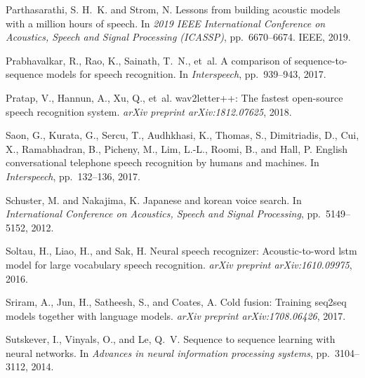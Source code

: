 \documentclass{article}
\begin{document}
\begin{thebibliography}{99}
Parthasarathi, S. H.~K. and Strom, N.
\newblock Lessons from building acoustic models with a million hours of speech.
\newblock In \emph{2019 IEEE International Conference on Acoustics, Speech and
  Signal Processing (ICASSP)}, pp.\  6670--6674. IEEE, 2019.

Prabhavalkar, R., Rao, K., Sainath, T.~N., et~al.
\newblock A comparison of sequence-to-sequence models for speech recognition.
\newblock In \emph{Interspeech}, pp.\  939--943, 2017.

Pratap, V., Hannun, A., Xu, Q., et~al.
\newblock wav2letter++: The fastest open-source speech recognition system.
\newblock \emph{arXiv preprint arXiv:1812.07625}, 2018.

Saon, G., Kurata, G., Sercu, T., Audhkhasi, K., Thomas, S., Dimitriadis, D.,
  Cui, X., Ramabhadran, B., Picheny, M., Lim, L.-L., Roomi, B., and Hall, P.
\newblock English conversational telephone speech recognition by humans and
  machines.
\newblock In \emph{Interspeech}, pp.\  132--136, 2017.

Schuster, M. and Nakajima, K.
\newblock Japanese and korean voice search.
\newblock In \emph{International Conference on Acoustics, Speech and Signal
  Processing}, pp.\  5149--5152, 2012.

Soltau, H., Liao, H., and Sak, H.
\newblock Neural speech recognizer: Acoustic-to-word lstm model for large
  vocabulary speech recognition.
\newblock \emph{arXiv preprint arXiv:1610.09975}, 2016.

Sriram, A., Jun, H., Satheesh, S., and Coates, A.
\newblock Cold fusion: Training seq2seq models together with language models.
\newblock \emph{arXiv preprint arXiv:1708.06426}, 2017.

Sutskever, I., Vinyals, O., and Le, Q.~V.
\newblock Sequence to sequence learning with neural networks.
\newblock In \emph{Advances in neural information processing systems}, pp.\
  3104--3112, 2014.


\end{thebibliography}
\end{document}

